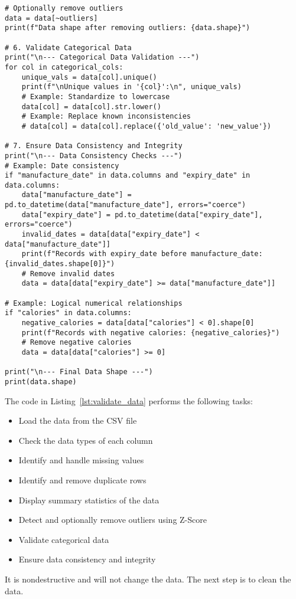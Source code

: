 \documentclass{article}
\begin{document}
\begin{lstlisting}[caption={Validate the Data}, label={lst:validate_data}]
# Optionally remove outliers
data = data[~outliers]
print(f"Data shape after removing outliers: {data.shape}")

# 6. Validate Categorical Data
print("\n--- Categorical Data Validation ---")
for col in categorical_cols:
    unique_vals = data[col].unique()
    print(f"\nUnique values in '{col}':\n", unique_vals)
    # Example: Standardize to lowercase
    data[col] = data[col].str.lower()
    # Example: Replace known inconsistencies
    # data[col] = data[col].replace({'old_value': 'new_value'})

# 7. Ensure Data Consistency and Integrity
print("\n--- Data Consistency Checks ---")
# Example: Date consistency
if "manufacture_date" in data.columns and "expiry_date" in data.columns:
    data["manufacture_date"] = pd.to_datetime(data["manufacture_date"], errors="coerce")
    data["expiry_date"] = pd.to_datetime(data["expiry_date"], errors="coerce")
    invalid_dates = data[data["expiry_date"] < data["manufacture_date"]]
    print(f"Records with expiry_date before manufacture_date: {invalid_dates.shape[0]}")
    # Remove invalid dates
    data = data[data["expiry_date"] >= data["manufacture_date"]]

# Example: Logical numerical relationships
if "calories" in data.columns:
    negative_calories = data[data["calories"] < 0].shape[0]
    print(f"Records with negative calories: {negative_calories}")
    # Remove negative calories
    data = data[data["calories"] >= 0]

print("\n--- Final Data Shape ---")
print(data.shape)

\end{lstlisting}

The code in Listing~\ref{lst:validate_data} performs the following tasks:
  \begin{itemize}
      \item Load the data from the CSV file
      \item Check the data types of each column
      \item Identify and handle missing values
      \item Identify and remove duplicate rows
      \item Display summary statistics of the data
      \item Detect and optionally remove outliers using Z-Score
      \item Validate categorical data
      \item Ensure data consistency and integrity
  \end{itemize}
It is nondestructive and will not change the data. The next step is to clean the data. 
\end{document}
